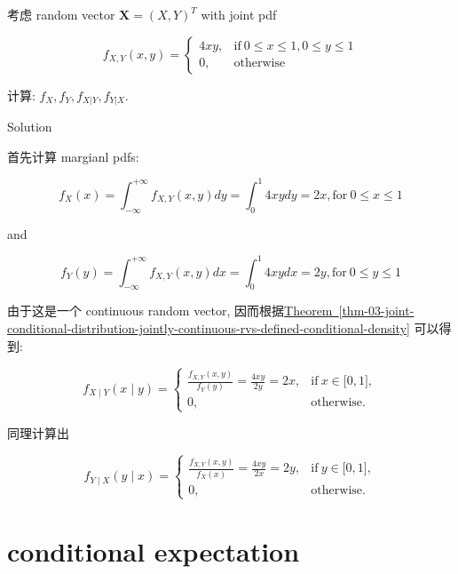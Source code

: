 \documentclass{qlnotes-export}
\begin{document}
\begin{example}\label{ex-03-joint-conditional-distribution-example-005}

考虑 random vector \(\mathbf{X} = (X,Y)^{T}\) with joint pdf

\[f_{X,Y}(x,y) = \left\{ \begin{matrix}
{4xy,} & {\text{if}\ 0 \leq x \leq 1,0 \leq y \leq 1} \\
{0,} & \text{otherwise}
\end{matrix} \right.\]

计算: \(f_{X},f_{Y},f_{X|Y},f_{Y|X}\).

\end{example}

\begin{qlsolution}{Solution}

首先计算 margianl pdfs:

\[f_{X}(x) = \int_{- \infty}^{+ \infty}f_{X,Y}(x,y)dy = \int_{0}^{1}4xydy = 2x,\text{for}\ 0 \leq x \leq 1\]

and

\[f_{Y}(y) = \int_{- \infty}^{+ \infty}f_{X,Y}(x,y)dx = \int_{0}^{1}4xydx = 2y,\text{for}\ 0 \leq y \leq 1\]

由于这是一个 continuous random vector, 因而根据\hyperref[thm-03-joint-conditional-distribution-jointly-continuous-rvs-defined-conditional-density]{Theorem~\ref*{thm-03-joint-conditional-distribution-jointly-continuous-rvs-defined-conditional-density}} 可以得到:

\[f_{X \mid Y}(x \mid y) = \left\{ \begin{matrix}
{\frac{f_{X,Y}(x,y)}{f_{Y}(y)} = \frac{4xy}{2y} = 2x,} & {\text{if}\ x \in \lbrack 0,1\rbrack,} \\
{0,} & \text{otherwise.}
\end{matrix} \right.\]

同理计算出

\[f_{Y \mid X}(y \mid x) = \left\{ \begin{matrix}
{\frac{f_{X,Y}(x,y)}{f_{X}(x)} = \frac{4xy}{2x} = 2y,} & {\text{if}\ y \in \lbrack 0,1\rbrack,} \\
{0,} & \text{otherwise.}
\end{matrix} \right.\]

\end{qlsolution}

\section{conditional expectation}\label{conditional-expectation}
\end{document}
